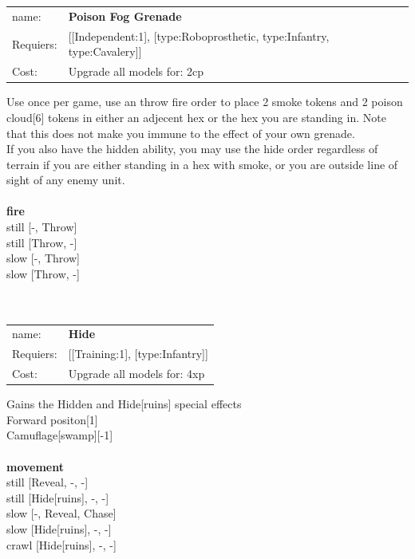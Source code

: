 {\ \\
\ \\
\begin{tabular}{ll}
name: & {\bf Poison Fog Grenade } \\
Requiers: & [[Independent:1], [type:Roboprosthetic, type:Infantry, type:Cavalery]] \\
Cost: & Upgrade all models for: 2cp \\
\end{tabular}

Use once per game, use an throw fire order to place 2 smoke tokens and 2 poison cloud[6] tokens in either an adjecent hex or the hex you are standing in. Note that this does not make you immune to the effect of your own grenade.\\ 
If you also have the hidden ability, you may use the hide order regardless of terrain if you are either standing in a hex with smoke, or you are outside line of sight of any enemy unit.\\ 








\ \\ {\bf fire } \\
still [-, Throw] \\
still [Throw, -] \\
slow [-, Throw] \\
slow [Throw, -] \\

\ \\
\ \\
\begin{tabular}{ll}
name: & {\bf Hide } \\
Requiers: & [[Training:1], [type:Infantry]] \\
Cost: & Upgrade all models for: 4xp \\
\end{tabular}

Gains the Hidden and Hide[ruins] special effects\\ 
Forward positon[1]\\ 
Camuflage[swamp][-1]\\ 








\ \\ {\bf movement } \\
still [Reveal, -, -] \\
still [Hide[ruins], -, -] \\
slow [-, Reveal, Chase] \\
slow [Hide[ruins], -, -] \\
crawl [Hide[ruins], -, -] \\

}
